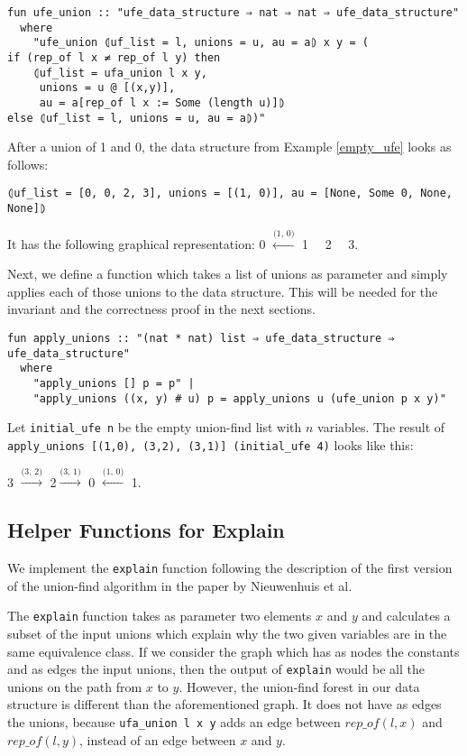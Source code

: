 \begin{lstlisting}
fun ufe_union :: "ufe_data_structure ⇒ nat ⇒ nat ⇒ ufe_data_structure"
  where
    "ufe_union ⦇uf_list = l, unions = u, au = a⦈ x y = (
if (rep_of l x ≠ rep_of l y) then
    ⦇uf_list = ufa_union l x y,
     unions = u @ [(x,y)],
     au = a[rep_of l x := Some (length u)]⦈
else ⦇uf_list = l, unions = u, au = a⦈)"
\end{lstlisting}

\begin{exmp}
After a union of 1 and 0, the data structure from Example \ref{empty_ufe} looks as follows:
\begin{lstlisting}
⦇uf_list = [0, 0, 2, 3], unions = [(1, 0)], au = [None, Some 0, None, None]⦈
\end{lstlisting}
It has the following graphical representation:
0 $\xleftarrow{\text{(1, 0)}}$ 1 \ \ 2 \ \ 3.
\end{exmp}

Next, we define a function which takes a list of unions as parameter and simply applies each of those unions to the data structure. This will be needed for the invariant and the correctness proof in the next sections.

\begin{lstlisting}
fun apply_unions :: "(nat * nat) list ⇒ ufe_data_structure ⇒ ufe_data_structure"
  where
    "apply_unions [] p = p" |
    "apply_unions ((x, y) # u) p = apply_unions u (ufe_union p x y)"
\end{lstlisting}

\begin{exmp}\label{example:apply-unions}
Let \lstinline|initial_ufe n| be the empty union-find list with $n$ variables. The result of \lstinline|apply_unions [(1,0), (3,2), (3,1)] (initial_ufe 4)| looks like this:

3 $\xrightarrow{\text{(3, 2)}}$ 2$\xrightarrow{\text{(3, 1)}}$ 0 $\xleftarrow{\text{(1, 0)}}$ 1.
\end{exmp}

\subsection{Helper Functions for Explain}\label{subsection:helper-functions}

We implement the \lstinline|explain| function following the description of the first version of the union-find algorithm in the paper by Nieuwenhuis et al. \cite{Nieuwenhuis}

The \lstinline|explain| function takes as parameter two elements $x$ and $y$ and calculates a subset of the input unions which explain why the two given variables are in the same equivalence class. If we consider the graph which has as nodes the constants and as edges the input unions, then the output of \lstinline|explain| would be all the unions on the path from $x$ to $y$. However, the union-find forest in our data structure is different than the aforementioned graph. It does not have as edges the unions, because \lstinline|ufa_union l x y| adds an edge between $rep\_of(l, x)$ and $rep\_of(l, y)$, instead of an edge between $x$ and $y$.

